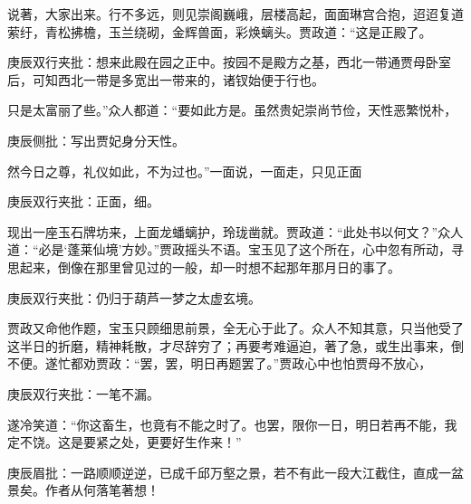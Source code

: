 \begin{parag}
    说著，大家出来。行不多远，则见崇阁巍峨，层楼高起，面面琳宫合抱，迢迢复道萦纡，青松拂檐，玉兰绕砌，金辉兽面，彩焕螭头。贾政道：“这是正殿了。\begin{note}庚辰双行夹批：想来此殿在园之正中。按园不是殿方之基，西北一带通贾母卧室后，可知西北一带是多宽出一带来的，诸钗始便于行也。\end{note}只是太富丽了些。”众人都道：“要如此方是。虽然贵妃崇尚节俭，天性恶繁悦朴，\begin{note}庚辰侧批：写出贾妃身分天性。\end{note}然今日之尊，礼仪如此，不为过也。”一面说，一面走，只见正面\begin{note}庚辰双行夹批：正面，细。\end{note}现出一座玉石牌坊来，上面龙蟠螭护，玲珑凿就。贾政道：“此处书以何文？”众人道：“必是‘蓬莱仙境’方妙。”贾政摇头不语。宝玉见了这个所在，心中忽有所动，寻思起来，倒像在那里曾见过的一般，却一时想不起那年那月日的事了。\begin{note}庚辰双行夹批：仍归于葫芦一梦之太虚玄境。\end{note}贾政又命他作题，宝玉只顾细思前景，全无心于此了。众人不知其意，只当他受了这半日的折磨，精神耗散，才尽辞穷了；再要考难逼迫，著了急，或生出事来，倒不便。遂忙都劝贾政：“罢，罢，明日再题罢了。”贾政心中也怕贾母不放心，\begin{note}庚辰双行夹批：一笔不漏。\end{note}遂冷笑道：“你这畜生，也竟有不能之时了。也罢，限你一日，明日若再不能，我定不饶。这是要紧之处，更要好生作来！”\begin{note}庚辰眉批：一路顺顺逆逆，已成千邱万壑之景，若不有此一段大江截住，直成一盆景矣。作者从何落笔著想！\end{note}
\end{parag}



